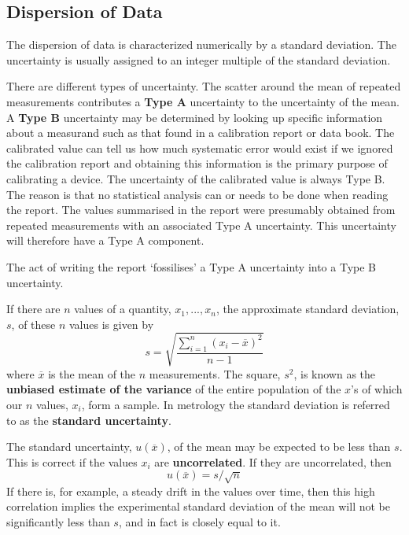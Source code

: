 \subsection{Dispersion of Data}

The dispersion of data is characterized numerically by a standard deviation. The uncertainty is usually assigned to an integer multiple of the standard deviation. 

There are different types of uncertainty. The scatter around the mean of repeated measurements contributes a \textbf{Type A} uncertainty to the uncertainty of the mean. A \textbf{Type B} uncertainty may be determined by looking up specific information about a measurand such as that found in a calibration report or data book. The calibrated value can tell us how much systematic error would exist if we ignored the calibration report and obtaining this information is the primary purpose of calibrating a device. The uncertainty of the calibrated value is always Type B. The reason is that no statistical analysis can or needs to be done when reading the report. The values summarised in the report were presumably obtained from repeated measurements with an associated Type A uncertainty. This uncertainty will therefore have a Type A component.

The act of writing the report `fossilises' a Type A uncertainty into a Type B uncertainty. 


If there are $n$ values of a quantity, $x_1,...,x_n$, the approximate standard deviation, $s$, of these $n$ values is given by
\begin{equation}
    s = \sqrt{\frac{\sum_{i=1}^n(x_i-\overline{x})^2}{n-1}}
\end{equation}
where $\overline{x}$ is the mean of the $n$ measurements. The square, $s^2$, is known as the \textbf{unbiased estimate of the variance} of the entire population of the $x$'s of which our $n$ values, $x_i$, form a sample. In metrology the standard deviation is referred to as the \textbf{standard uncertainty}. 

The standard uncertainty, $u(\overline{x})$, of the mean may be expected to be less than $s$. This is correct if the values $x_i$ are \textbf{uncorrelated}. If they are uncorrelated, then
\begin{equation}
    u(\overline{x}) = s/\sqrt{n}
\end{equation}
If there is, for example, a steady drift in the values over time, then this high correlation implies the experimental standard deviation of the mean will not be significantly less than $s$, and in fact is closely equal to it.


